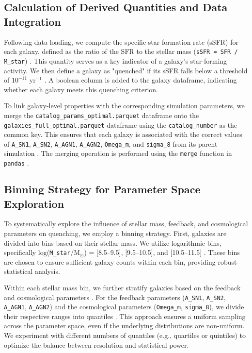 \documentclass[twocolumn]{aastex631}
\begin{document}
\subsection{Calculation of Derived Quantities and Data Integration}
Following data loading, we compute the specific star formation rate (sSFR) for each galaxy, defined as the ratio of the SFR to the stellar mass (\texttt{sSFR = SFR / M\_star}) \citep{bauer2005specificstarformationrates}. This quantity serves as a key indicator of a galaxy's star-forming activity. We then define a galaxy as "quenched" if its sSFR falls below a threshold of $10^{-11}$ yr$^{-1}$ \citep{whitaker2017predictingquiescencedependencespecific,katsianis2020specificstarformationrate,leslie2020vlacosmos3ghzlarge}. A boolean column is added to the galaxy dataframe, indicating whether each galaxy meets this quenching criterion.

To link galaxy-level properties with the corresponding simulation parameters, we merge the \texttt{catalog\_params\_optimal.parquet} dataframe onto the \texttt{galaxies\_full\_optimal.parquet} dataframe using the \texttt{catalog\_number} as the common key. This ensures that each galaxy is associated with the correct values of \texttt{A\_SN1}, \texttt{A\_SN2}, \texttt{A\_AGN1}, \texttt{A\_AGN2}, \texttt{Omega\_m}, and \texttt{sigma\_8} from its parent simulation \citep{contardo2025effectsparametersgalaxyproperties}. The merging operation is performed using the \texttt{merge} function in \texttt{pandas} \citep{desanti2025fieldlevelsimulationbasedinferencegalaxy,ivanov2025fullshapeanalysissimulationbasedpriors}.

\subsection{Binning Strategy for Parameter Space Exploration}
To systematically explore the influence of stellar mass, feedback, and cosmological parameters on quenching, we employ a binning strategy. First, galaxies are divided into bins based on their stellar mass. We utilize logarithmic bins, specifically log(\texttt{M\_star}/M$_\odot$) = [8.5–9.5], [9.5–10.5], and [10.5–11.5] \citep{porrasvalverde2024signatureblackholesquenched}. These bins are chosen to ensure sufficient galaxy counts within each bin, providing robust statistical analysis.

Within each stellar mass bin, we further stratify galaxies based on the feedback and cosmological parameters \citep{vaughan2024samigalaxysurveypredicting}. For the feedback parameters (\texttt{A\_SN1}, \texttt{A\_SN2}, \texttt{A\_AGN1}, \texttt{A\_AGN2}) and the cosmological parameters (\texttt{Omega\_m}, \texttt{sigma\_8}), we divide their respective ranges into quantiles \citep{arangotoro2025cosmoswebhistorygalaxymigrations}. This approach ensures a uniform sampling across the parameter space, even if the underlying distributions are non-uniform. We experiment with different numbers of quantiles (e.g., quartiles or quintiles) to optimize the balance between resolution and statistical power.
\end{document}
